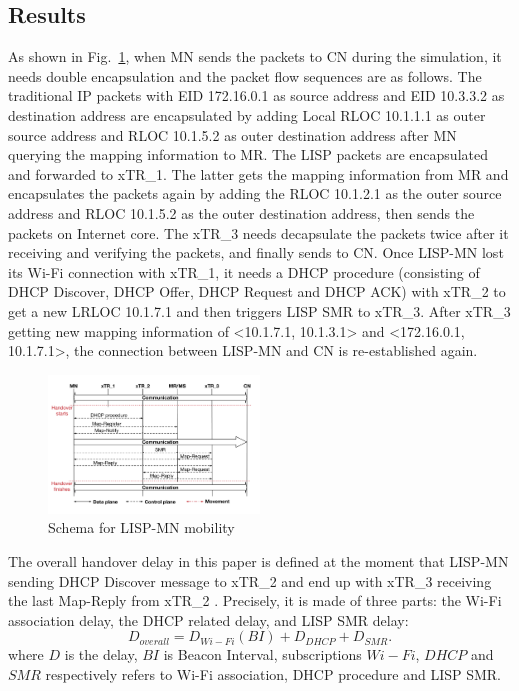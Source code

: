 \subsection{Results}\label{sec:results}
As shown in Fig.~\ref{sim_schema}, when MN sends the packets to CN during the
simulation, it needs double encapsulation and the packet flow sequences are as
follows. The traditional IP packets with EID 172.16.0.1 as source address and
EID 10.3.3.2 as destination address are encapsulated by adding Local RLOC
10.1.1.1 as outer source address and RLOC 10.1.5.2 as outer destination address
after MN querying the mapping information to MR. The LISP packets are
encapsulated and forwarded to xTR\_1. The latter gets the mapping information
from MR and encapsulates the packets again by adding the RLOC 10.1.2.1 as the
outer source address and RLOC 10.1.5.2 as the outer destination address, then
sends the packets on Internet core. The xTR\_3 needs decapsulate the packets
twice after it receiving and verifying the packets, and finally sends to CN.
Once LISP-MN lost its Wi-Fi connection with xTR\_1, it needs a DHCP procedure
(consisting of DHCP Discover, DHCP Offer, DHCP Request and DHCP ACK) with xTR\_2
to get a new LRLOC 10.1.7.1 and then triggers LISP SMR to xTR\_3. After xTR\_3
getting new mapping information of <10.1.7.1, 10.1.3.1> and <172.16.0.1,
10.1.7.1>, the connection between LISP-MN and CN is re-established again.

\begin{figure}[!th]
	\centering
	\includegraphics[width=0.5\textwidth]{Pics/Mobility_router_MN_supports_LISP_schema_SMR_simplify}
	\caption{Schema for LISP-MN mobility}
	\label{sim_schema}
\end{figure}

The overall handover delay in this paper is defined at the moment that LISP-MN
sending DHCP Discover message to xTR\_2 and end up with xTR\_3 receiving the
last Map-Reply from xTR\_2 . Precisely, it is made of three
parts:
the Wi-Fi association delay, the DHCP related delay, and LISP SMR delay:
\begin{equation}
    D_{overall} = D_{Wi-Fi}(BI) + D_{DHCP} + D_{SMR} \nonumber .
\end{equation}
where $D$ is the delay, $BI$ is Beacon Interval, subscriptions $Wi-Fi$, $DHCP$
and $SMR$ respectively refers to Wi-Fi association, DHCP procedure and LISP SMR.

